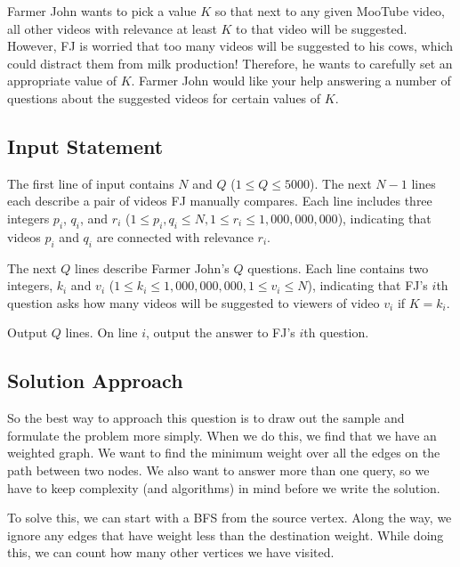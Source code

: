 \documentclass{article}
\begin{document}
Farmer John wants to pick a value $K$ so that next to any given MooTube video, all other videos with relevance at least $K$ to that video will be suggested. However, FJ is worried that too many videos will be suggested to his cows, which could distract them from milk production! Therefore, he wants to carefully set an appropriate value of $K$. Farmer John would like your help answering a number of questions about the suggested videos for certain values of $K$.
\subsection{Input Statement}
The first line of input contains $N$ and $Q$ ($1 \leq Q \leq 5000$).
The next $N-1$ lines each describe a pair of videos FJ manually compares. Each line includes three integers $p_i$, $q_i$, and $r_i$ ($1 \leq p_i, q_i \leq N, 1 \leq r_i \leq 1,000,000,000$), indicating that videos $p_i$ and $q_i$ are connected with relevance $r_i$. 

The next $Q$ lines describe Farmer John's $Q$ questions. Each line contains two integers, $k_i$ and $v_i$ ($1 \leq k_i \leq 1,000,000,000, 1 \leq v_i \leq N$), indicating that FJ's $i$th question asks how many videos will be suggested to viewers of video $v_i$ if $K = k_i$.

Output $Q$ lines. On line $i$, output the answer to FJ's $i$th question.

\subsection{Solution Approach}
So the best way to approach this question is to draw out the sample and formulate the problem more simply. When we do this, we find that we have an weighted graph. We want to find the minimum weight over all the edges on the path between two nodes. We also want to answer more than one query, so we have to keep complexity (and algorithms) in mind before we write the solution. 

To solve this, we can start with a BFS from the source vertex. Along the way, we ignore any edges that have weight less than the destination weight. While doing this, we can count how many other vertices we have visited.
\end{document}
